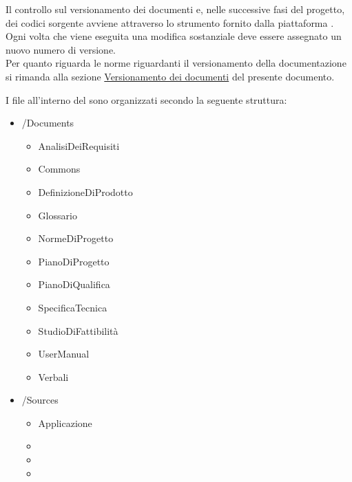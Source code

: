 		Il controllo sul versionamento dei documenti e, nelle successive fasi del progetto, dei codici sorgente avviene attraverso lo strumento fornito dalla piattaforma .\\
		Ogni volta che viene eseguita una modifica sostanziale deve essere assegnato un nuovo numero di versione.\\
		Per quanto riguarda le norme riguardanti il versionamento della documentazione si rimanda alla sezione \hyperref[sec:versioni]{Versionamento dei documenti} del presente documento.

					I file all’interno del  sono organizzati secondo la seguente struttura:
					\begin{itemize}
						\item /Documents
						\begin{itemize}
							\item AnalisiDeiRequisiti
							\item Commons
							\item DefinizioneDiProdotto
							\item Glossario
							\item NormeDiProgetto
							\item PianoDiProgetto
							\item PianoDiQualifica
							\item SpecificaTecnica
							\item StudioDiFattibilità
							\item UserManual
							\item Verbali
						\end{itemize}
						\item /Sources
						\begin{itemize}
							\item Applicazione
							\item {}
							\item {}
							\item {}
						\end{itemize}
					\end{itemize}

